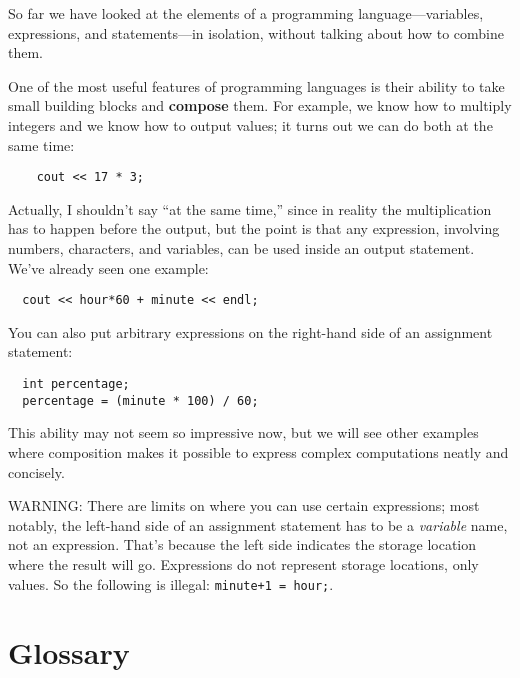 So far we have looked at the elements of a programming
language---variables, expressions, and statements---in
isolation, without talking about how to combine them.

One of the most useful features of programming languages
is their ability to take small building blocks and
{\bf compose} them.  For example, we know how to multiply
integers and we know how to output values; it turns out we can
do both at the same time:

\begin{verbatim}
    cout << 17 * 3;
\end{verbatim}
%
Actually, I shouldn't say ``at the same time,'' since in reality
the multiplication has to happen before the output, but
the point is that any expression, involving numbers, characters,
and variables, can be used inside an output statement.  We've
already seen one example:

\begin{verbatim}
  cout << hour*60 + minute << endl;
\end{verbatim}
%
You can also put arbitrary expressions on the right-hand
side of an assignment statement:

\begin{verbatim}
  int percentage;
  percentage = (minute * 100) / 60;
\end{verbatim}
%
This ability may not seem so impressive now, but we will see
other examples where composition makes it possible
to express complex computations neatly and concisely.

WARNING: There are limits on where you can use certain
expressions; most notably, the left-hand side of an assignment
statement has to be a {\em variable} name, not an expression.
That's because the left side indicates the storage location
where the result will go.  Expressions
do not represent storage locations, only values.  So the
following is illegal:  {\tt minute+1 = hour;}.

\section{Glossary}

